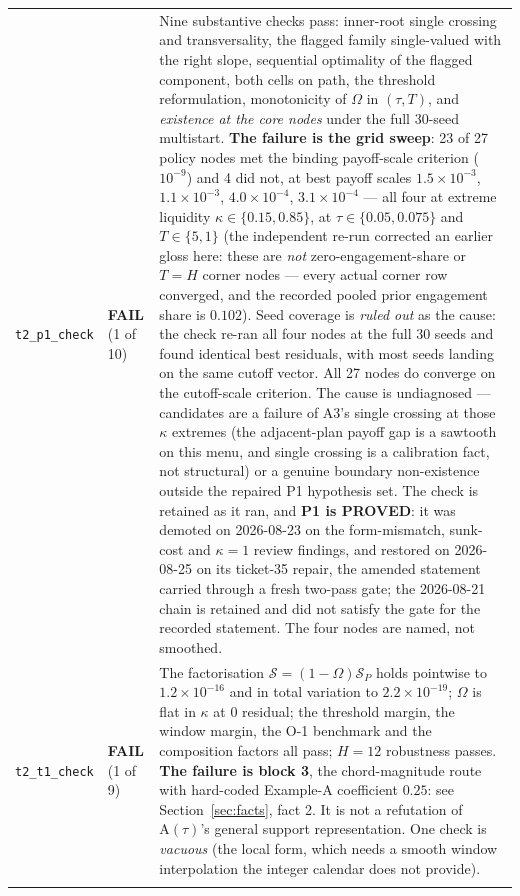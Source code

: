 \documentclass[11pt,a4paper]{article}
\newcommand{\Atau}{\mathrm{A}(\tau)}
\begin{document}
\begin{longtable}{@{}>{\raggedright\arraybackslash}p{}>{\raggedright\arraybackslash}p{}>{\raggedright\arraybackslash}p{}@{}}
\texttt{t2\_p1\_check} & \textbf{FAIL} (1 of 10) &
Nine substantive checks pass: inner-root single crossing and transversality, the
flagged family single-valued with the right slope, sequential optimality of the
flagged component, both cells on path, the threshold reformulation, monotonicity of
$\Omega$ in $(\tau,T)$, and \emph{existence at the core nodes} under the full 30-seed
multistart. \textbf{The failure is the grid sweep}: 23 of 27 policy nodes met the
binding payoff-scale criterion ($10^{-9}$) and 4 did not, at best payoff scales
$1.5\times10^{-3}$, $1.1\times10^{-3}$, $4.0\times10^{-4}$, $3.1\times10^{-4}$ ---
all four at extreme liquidity $\kappa\in\{0.15,0.85\}$, at
$\tau\in\{0.05,0.075\}$ and $T\in\{5,1\}$ (the independent re-run corrected an
earlier gloss here: these are \emph{not} zero-engagement-share or $T{=}H$ corner
nodes --- every actual corner row converged, and the recorded pooled prior
engagement share is $0.102$). Seed coverage is
\emph{ruled out} as the cause: the check re-ran all four nodes at the full 30
seeds and found identical best residuals, with most seeds landing on the same
cutoff vector. All 27 nodes do converge on the cutoff-scale criterion. The cause
is undiagnosed --- candidates are a failure of A3's single crossing at those
$\kappa$ extremes (the adjacent-plan payoff gap is a sawtooth on this menu, and
single crossing is a calibration fact, not structural) or a genuine boundary
non-existence outside the repaired P1 hypothesis set. The check is retained as it ran,
and \textbf{P1 is PROVED}: it was demoted on 2026-08-23 on the form-mismatch,
sunk-cost and $\kappa=1$ review findings, and restored on 2026-08-25 on its ticket-35
repair, the amended statement carried through a fresh two-pass gate; the 2026-08-21
chain is retained and did not satisfy the gate for the recorded statement. The four
nodes are named, not smoothed. \\
\addlinespace

\texttt{t2\_t1\_check} & \textbf{FAIL} (1 of 9) &
The factorisation $\mathcal S=(1-\Omega)\mathcal S_P$ holds pointwise to
$1.2\times10^{-16}$ and in total variation to $2.2\times10^{-19}$; $\Omega$ is flat in
$\kappa$ at $0$ residual; the threshold margin, the window margin, the O-1 benchmark
and the composition factors all pass; $H=12$ robustness passes.
\textbf{The failure is block 3}, the chord-magnitude route with hard-coded Example-A
coefficient $0.25$: see Section~\ref{sec:facts}, fact 2. It is not a refutation of $\Atau$'s
general support representation. One check is \emph{vacuous} (the local form, which
needs a smooth window interpolation the integer calendar does not provide). \\
\addlinespace


\end{longtable}
\end{document}
